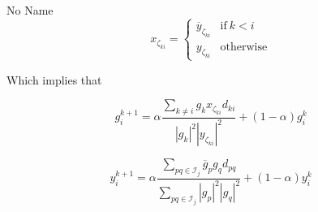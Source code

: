 \documentclass[a4paper,10pt]{article}
\newcommand{\conj}[1]{\overline{#1}}
\newcommand\coolrightbrace[2]{%
\left.\vphantom{\begin{matrix} #1 \end{matrix}}\right\}#2}
\begin{document}
\begin{section}{No Name}
\begin{equation}
x_{\zeta_{ki}} = 
\begin{cases}
\conj{y}_{\zeta_{ki}} & \textrm{if}~k < i\\
y_{\zeta_{ki}} & \textrm{otherwise}
\end{cases}
\end{equation}

Which implies that 

\begin{equation}
g_{i}^{k+1} = \alpha \frac{\sum_{k\neq i } g_k x_{\zeta_{ki}}d_{ki}}{|g_k|^2|y_{\zeta_{ki}}|^2} + (1-\alpha) g_i^k 
\end{equation}

\begin{equation}
y_{i}^{k+1} = \alpha \frac{\sum_{pq \in \mathcal{I}_j} \conj{g}_p g_q d_{pq}}{\sum_{pq \in \mathcal{I}_j}|g_p|^2|g_q|^2} + (1-\alpha) y_i^k 
\end{equation}















\end{section}
\end{document}
